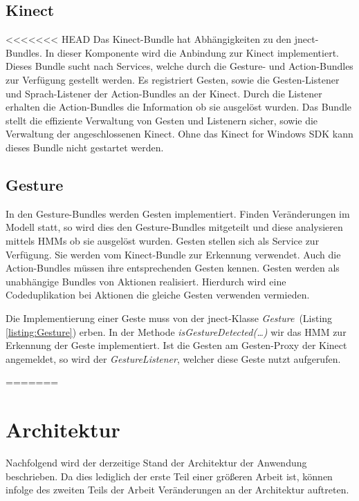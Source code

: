 \subsection{Kinect}

<<<<<<< HEAD
Das Kinect-Bundle hat Abh\"angigkeiten zu den jnect-Bundles. In dieser Komponente wird die Anbindung zur Kinect implementiert. Dieses Bundle 
sucht nach Services, welche durch die Gesture- und Action-Bundles zur Verf\"ugung gestellt werden. Es registriert Gesten, sowie die 
Gesten-Listener und Sprach-Listener der Action-Bundles an der Kinect. Durch die Listener erhalten die Action-Bundles die Information 
ob sie ausgel\"ost wurden. Das Bundle stellt die effiziente Verwaltung von Gesten und Listenern sicher, sowie die Verwaltung der 
angeschlossenen Kinect. Ohne das Kinect for Windows \acrshort{SDK} kann dieses Bundle nicht gestartet werden.

\subsection{Gesture}

In den Gesture-Bundles werden Gesten implementiert. Finden Ver\"anderungen im Modell statt, so wird dies den Gesture-Bundles mitgeteilt und 
diese analysieren mittels HMMs ob sie ausgel\"ost wurden. Gesten stellen sich als Service zur Verf\"ugung. Sie werden vom Kinect-Bundle zur 
Erkennung verwendet. Auch die Action-Bundles m\"ussen ihre entsprechenden Gesten kennen. Gesten werden als unabh\"angige Bundles von Aktionen 
realisiert. Hierdurch wird eine Codeduplikation bei Aktionen die gleiche Gesten verwenden vermieden.

Die Implementierung einer Geste muss von der jnect-Klasse \textit{Gesture}~(Listing \ref{listing:Gesture}) erben. In der Methode 
\textit{isGestureDetected(\ldots)} wir das HMM zur Erkennung der Geste implementiert. Ist die Gesten am Gesten-Proxy der Kinect 
angemeldet, so wird der \textit{GestureListener}, welcher diese Geste nutzt aufgerufen.

\par\smallskip
\lstset{language=Java}
=======
\section{Architektur}

Nachfolgend wird der derzeitige Stand der Architektur der Anwendung beschrieben. Da dies lediglich der erste Teil einer gr\"oßeren Arbeit ist, k\"onnen infolge des zweiten Teils der Arbeit Ver\"anderungen an der Architektur auftreten. 

